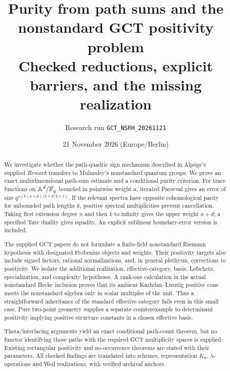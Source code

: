 \documentclass[11pt,a4paper]{article}
\title{Purity from path sums and the nonstandard GCT positivity problem\\[4pt]\large Checked reductions, explicit barriers, and the missing realization}
\author{Research run \texttt{GCT\_NSRH\_20261121}}
\date{21 November 2026 (Europe/Berlin)}
\newcommand{\A}{\mathbb A}\newcommand{\PP}{\mathbb P}\newcommand{\GL}{\mathrm{GL}}
\theoremstyle{named}\newtheorem{finding}{Finding}[section]
\theoremstyle{definition}\newtheorem{definition}[finding]{Definition}
\theoremstyle{remark}\newtheorem{remark}[finding]{Remark}
\begin{document}
\maketitle
\begin{abstract}
We investigate whether the path-quadric sign mechanism described in Alp\"oge's supplied \emph{Remark} transfers to Mulmuley's nonstandard quantum groups. We prove an exact multidimensional path-sum estimate and a conditional purity criterion. For trace functions on $\A^d/\F_q$ bounded in pointwise weight $a$, iterated Parseval gives an error of size $q^{n(k(a+d)/2+d/2+1)}$. If the relevant spectra have opposite cohomological parity for unbounded path lengths $k$, positive spectral multiplicities prevent cancellation. Taking first extension degree $n$ and then $k$ to infinity gives the upper weight $a+d$; a specified Tate duality gives equality. An explicit sublinear boundary-error version is included.

The supplied GCT papers do not formulate a finite-field nonstandard Riemann hypothesis with designated Frobenius objects and weights. Their positivity targets also include signed factors, rational normalizations, and, in general plethysm, corrections to positivity. We isolate the additional realization, effective-category, basis, Lefschetz, specialization, and complexity hypotheses. A rank-one calculation in the actual nonstandard Hecke inclusion proves that its ambient Kazhdan--Lusztig positive cone meets the nonstandard algebra only in scalar multiples of the unit. Thus a straightforward inheritance of the standard effective category fails even in this small case. Pure two-point geometry supplies a separate counterexample to determinant positivity implying positive structure constants in a chosen effective basis.

Theta/interlacing arguments yield an exact conditional path-count theorem, but no functor identifying those paths with the required GCT multiplicity spaces is supplied. Existing rectangular positivity and no-occurrence theorems are stated with their parameters. All checked findings are translated into schemes, representation $K_0$, $\lambda$-operations and Weil realizations, with verified archival anchors.
\end{abstract}
\begin{center}
\end{center}
\newpage\setcounter{tocdepth}{1}{\small\tableofcontents}\newpage
\end{document}
